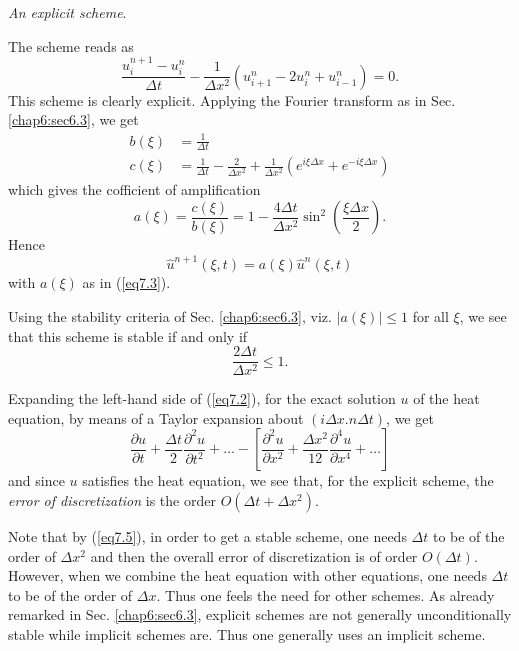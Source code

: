 \begin{exam}\label{chap7:exam7.1}
{\em An explicit scheme}.

The scheme reads as
\begin{equation*}
\frac{u^{n+1}_i - u^n_i}{\Delta t} - \frac{1}{\Delta x^2} (u^n_{i+1} -
2 u^n_i + u^n_{i-1})  = 0.\tag{7.2}\label{eq7.2}
\end{equation*}
This scheme is clearly explicit. Applying the Fourier transform as in
Sec. \ref{chap6:sec6.3}, we get
\begin{align*}
b(\xi) & = \frac{1}{\Delta t}\\
c(\xi) & = \frac{1}{\Delta t} - \frac{2}{\Delta x^2} + \frac{1}{\Delta
x^2} (e^{i\xi \Delta x} + e^{-i \xi \Delta x})
\end{align*}
which gives the cofficient of amplification
\begin{equation*}
a(\xi) = \frac{c(\xi)}{b(\xi)} =1 - \frac{4\Delta t}{\Delta x^2}
\sin^2 (\frac{\xi \Delta x}{2}). \tag{7.3}\label{eq7.3}
\end{equation*}\pageoriginale
Hence 
\begin{equation*}
\hat{u}^{n+1} (\xi,t) = a(\xi) \hat{u}^n (\xi,t)\tag{7.4}\label{eq7.4}
\end{equation*}
with $a(\xi)$ as in (\ref{eq7.3}).

Using the stability criteria of Sec. \ref{chap6:sec6.3}, viz. $|a(\xi)| \leq 1$ for
all $\xi$, we see that this scheme is stable if and only if 
\begin{equation*}
\frac{2\Delta t}{\Delta x^2} \leq 1.
\tag{7.5}\label{eq7.5}
\end{equation*}

Expanding the left-hand side of (\ref{eq7.2}), for the exact solution $u$ of
the heat equation, by means of a Taylor expansion about $(i \Delta
x. n \Delta t)$, we get
$$
\frac{\partial u}{\partial t} + \frac{\Delta t}{2}  \frac{\partial^2
  u}{\partial t^2} + \ldots - \left[ \frac{\partial^2 u}{\partial x^2}
  + \frac{\Delta x^2}{ 12} \frac{\partial^4 u}{\partial x^4} + \ldots
  \right] 
$$
and since $u$ satisfies the heat equation, we see that, for the
explicit scheme, the {\em error of discretization} is the order
$O(\Delta t+ \Delta x^2)$.

Note that by (\ref{eq7.5}), in order to get a stable scheme, one needs $\Delta
t$ to be of the order of $\Delta x^2$ and then the overall error of
discretization is of order $O(\Delta t)$. However, when we combine the
heat equation with other equations, one needs $\Delta t$ to be of the
order of $\Delta x$. Thus one feels the need for other schemes. As
already remarked in Sec. \ref{chap6:sec6.3}, explicit schemes are not generally
unconditionally stable while implicit schemes are. Thus one generally
uses an implicit scheme.
\end{exam}

